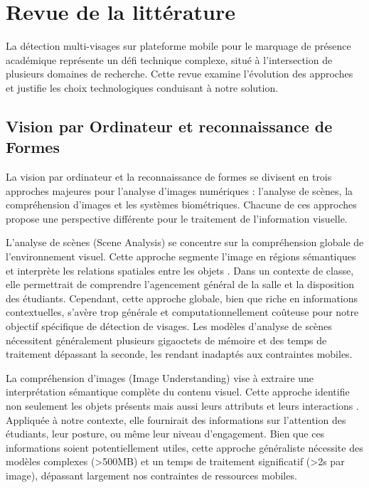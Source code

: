 \chapter{Revue de la littérature}
\begin{onehalfspace}

\hspace{0.65cm}La détection multi-visages sur plateforme mobile pour le marquage de présence académique représente un défi technique complexe, situé à l'intersection de plusieurs domaines de recherche. Cette revue examine l'évolution des approches et justifie les choix technologiques conduisant à notre solution.


\section{Vision par Ordinateur et reconnaissance de Formes}

\hspace{0.65cm}La vision par ordinateur et la reconnaissance de formes se divisent en trois approches majeures pour l'analyse d'images numériques : l'analyse de scènes, la compréhension d'images et les systèmes biométriques. Chacune de ces approches propose une perspective différente pour le traitement de l'information visuelle.

\hspace{0.65cm}L'analyse de scènes (Scene Analysis) se concentre sur la compréhension globale de l'environnement visuel. Cette approche segmente l'image en régions sémantiques et interprète les relations spatiales entre les objets \cite{Mohammed2024InsightsII}. Dans un contexte de classe, elle permettrait de comprendre l'agencement général de la salle et la disposition des étudiants. Cependant, cette approche globale, bien que riche en informations contextuelles, s'avère trop générale et computationnellement coûteuse pour notre objectif spécifique de détection de visages. Les modèles d'analyse de scènes nécessitent généralement plusieurs gigaoctets de mémoire et des temps de traitement dépassant la seconde, les rendant inadaptés aux contraintes mobiles.

\hspace{0.65cm}La compréhension d'images (Image Understanding) vise à extraire une interprétation sémantique complète du contenu visuel. Cette approche identifie non seulement les objets présents mais aussi leurs attributs et leurs interactions \cite{Astolfi2021Syntactic}. Appliquée à notre contexte, elle fournirait des informations sur l'attention des étudiants, leur posture, ou même leur niveau d'engagement. Bien que ces informations soient potentiellement utiles, cette approche généraliste nécessite des modèles complexes (>500MB) et un temps de traitement significatif (>2s par image), dépassant largement nos contraintes de ressources mobiles.


\end{onehalfspace}
